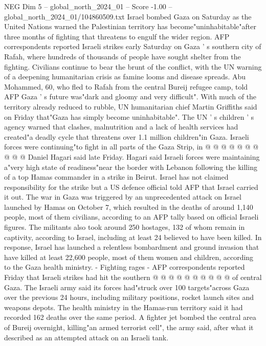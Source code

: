 \begin{textsample}{NEG Dim 5 – global\_north\_2024\_01 – Score -1.00 – global\_north\_2024\_01/104860509.txt}  \label{ex:f5_neg_347}
Israel bombed Gaza on Saturday as the United Nations warned the Palestinian territory has become"uninhabitable"after three months of fighting that threatens to engulf the wider region.
AFP correspondents reported Israeli strikes early Saturday on Gaza ' s southern city of Rafah, where hundreds of thousands of people have sought shelter from the fighting.
Civilians continue to bear the brunt of the conflict, with the UN warning of a deepening humanitarian crisis as famine looms and disease spreads.
Abu Mohammed, 60, who fled to Rafah from the central Bureij refugee camp, told AFP Gaza ' s future was"dark and gloomy and very difficult".
With much of the territory already reduced to rubble, UN humanitarian chief Martin Griffiths said on Friday that"Gaza has simply become uninhabitable".
The UN ' s children ' s agency warned that clashes, malnutrition and a lack of health services had created"a deadly cycle that threatens over 1.1 million children"in Gaza.
Israeli forces were continuing"to fight in all parts of the Gaza Strip, in @ @ @ @ @ @ @ @ @ @ Daniel Hagari said late Friday.
Hagari said Israeli forces were maintaining a"very high state of readiness"near the border with Lebanon following the killing of a top Hamas commander in a strike in Beirut.
Israel has not claimed responsibility for the strike but a US defence official told AFP that Israel carried it out.
The war in Gaza was triggered by an unprecedented attack on Israel launched by Hamas on October 7, which resulted in the deaths of around 1,140 people, most of them civilians, according to an AFP tally based on official Israeli figures.
The militants also took around 250 hostages, 132 of whom remain in captivity, according to Israel, including at least 24 believed to have been killed.
In response, Israel has launched a relentless bombardment and ground invasion that have killed at least 22,600 people, most of them women and children, according to the Gaza health ministry. - Fighting rages - AFP correspondents reported Friday that Israeli strikes had hit the southern @ @ @ @ @ @ @ @ @ @ of central Gaza.
The Israeli army said its forces had"struck over 100 targets"across Gaza over the previous 24 hours, including military positions, rocket launch sites and weapons depots.
The health ministry in the Hamas-run territory said it had recorded 162 deaths over the same period.
A fighter jet bombed the central area of Bureij overnight, killing"an armed terrorist cell", the army said, after what it described as an attempted attack on an Israeli tank.

\end{textsample}
